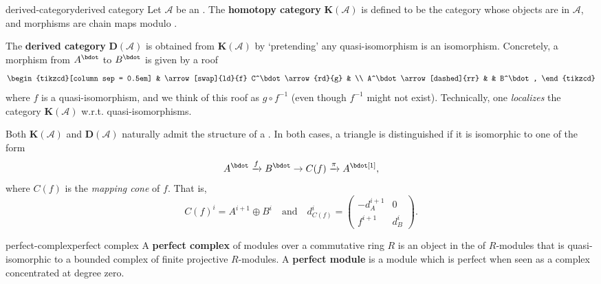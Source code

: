 \begin{topic}{derived-category}{derived category}
    Let $\mathcal{A}$ be an . The \textbf{homotopy category} $\textbf{K}(\mathcal{A})$ is defined to be the category whose objects are  in $\mathcal{A}$, and morphisms are chain maps modulo .
    
    The \textbf{derived category} $\textbf{D}(\mathcal{A})$ is obtained from $\textbf{K}(\mathcal{A})$ by `pretending' any quasi-isomorphism is an isomorphism. Concretely, a morphism from $A^\bdot$ to $B^\bdot$ is given by a roof
    \[ \begin{tikzcd}[column sep = 0.5em] & \arrow[swap]{ld}{f} C^\bdot \arrow{rd}{g} & \\ A^\bdot \arrow[dashed]{rr} & & B^\bdot , \end{tikzcd} \]
    where $f$ is a quasi-isomorphism, and we think of this roof as $g \circ f^{-1}$ (even though $f^{-1}$ might not exist). Technically, one \textit{localizes} the category $\textbf{K}(\mathcal{A})$ w.r.t. quasi-isomorphisms.
    
    Both $\textbf{K}(\mathcal{A})$ and $\textbf{D}(\mathcal{A})$ naturally admit the structure of a . In both cases, a triangle is distinguished if it is isomorphic to one of the form
    \[ A^\bdot \xrightarrow{f} B^\bdot \to C(f) \xrightarrow{\pi} A^\bdot[1] , \]
    where $C(f)$ is the \textit{mapping cone} of $f$. That is,
    \[ C(f)^i = A^{i + 1} \oplus B^i \quad \text{and} \quad d_{C(f)}^i = \begin{pmatrix} -d_A^{i + 1} & 0 \\ f^{i + 1} & d_B^i \end{pmatrix} . \]
\end{topic}

    

\begin{topic}{perfect-complex}{perfect complex}
    A \textbf{perfect complex} of modules over a commutative ring $R$ is an object in the  of $R$-modules that is quasi-isomorphic to a bounded complex of finite projective $R$-modules. A \textbf{perfect module} is a module which is perfect when seen as a complex concentrated at degree zero.
\end{topic}
